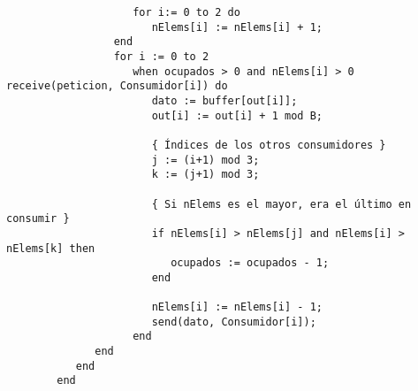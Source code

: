 \begin{ejercicio}
\begin{verbatim}
                    for i:= 0 to 2 do
                       nElems[i] := nElems[i] + 1;
                 end
                 for i := 0 to 2
                    when ocupados > 0 and nElems[i] > 0 receive(peticion, Consumidor[i]) do
                       dato := buffer[out[i]];
                       out[i] := out[i] + 1 mod B;

                       { Índices de los otros consumidores }
                       j := (i+1) mod 3;
                       k := (j+1) mod 3;

                       { Si nElems es el mayor, era el último en consumir }
                       if nElems[i] > nElems[j] and nElems[i] > nElems[k] then
                          ocupados := ocupados - 1;
                       end

                       nElems[i] := nElems[i] - 1;
                       send(dato, Consumidor[i]);
                    end
              end
           end
        end
    \end{verbatim}
\end{ejercicio}

